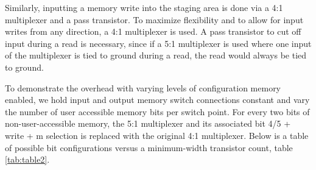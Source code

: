 Similarly, inputting a memory write into the staging area is done via a 4:1 multiplexer and a pass transistor. To maximize flexibility and to allow for input writes from any direction, a 4:1 multiplexer is used. A pass transistor to cut off input during a read is necessary, since if a 5:1 multiplexer is used where one input of the multiplexer is tied to ground during a read, the read would always be tied to ground.



To demonstrate the overhead with varying levels of configuration memory enabled, we hold input and output memory switch connections constant and vary the number of user accessible memory bits per switch point. For every two bits of non-user-accessible memory, the 5:1 multiplexer and its associated bit 4/5 + write + m selection is replaced with the original 4:1 multiplexer. Below is a table of possible bit configurations versus a minimum-width transistor count, table \ref{tab:table2}.


